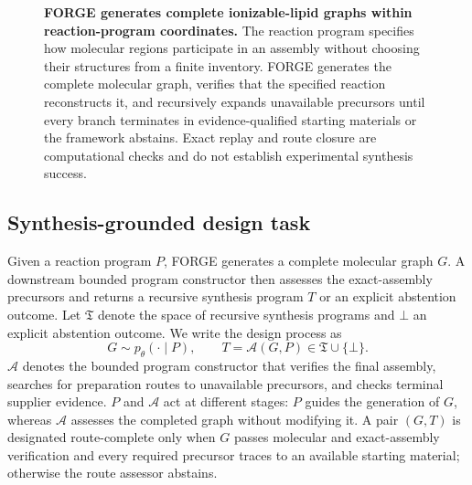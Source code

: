 \documentclass{article}
\begin{document}
\begin{figure}[t]
\centering
{}
\caption{\textbf{FORGE generates complete ionizable-lipid graphs within reaction-program
coordinates.}
The reaction program specifies how molecular regions participate in an assembly without choosing
their structures from a finite inventory.
FORGE generates the complete molecular graph, verifies that the specified reaction reconstructs it,
and recursively expands unavailable precursors until every branch terminates in evidence-qualified
starting materials or the framework abstains.
Exact replay and route closure are computational checks and do not establish experimental synthesis
success.}
\label{fig:forge-overview}
\end{figure}

\subsection{Synthesis-grounded design task}

Given a reaction program $P$, FORGE generates a complete molecular graph $G$. A downstream bounded
program constructor then assesses the exact-assembly precursors and returns a recursive synthesis
program $T$ or an explicit abstention outcome.
Let $\mathfrak{T}$ denote the space of recursive synthesis programs and $\bot$ an explicit abstention
outcome.
We write the design process as
\begin{equation}
    G\sim p_\theta(\cdot\mid P),
    \qquad
    T=\mathcal{A}(G,P)\in\mathfrak{T}\cup\{\bot\}.
\end{equation}
$\mathcal{A}$ denotes the bounded program constructor that verifies the final assembly, searches for
preparation routes to unavailable precursors, and checks terminal supplier evidence.
$P$ and $\mathcal{A}$ act at different stages: $P$ guides the generation of $G$, whereas
$\mathcal{A}$ assesses the completed graph without modifying it.
A pair $(G,T)$ is designated route-complete only when $G$ passes molecular and exact-assembly
verification and every required precursor traces to an available starting material; otherwise the
route assessor abstains.
\end{document}
